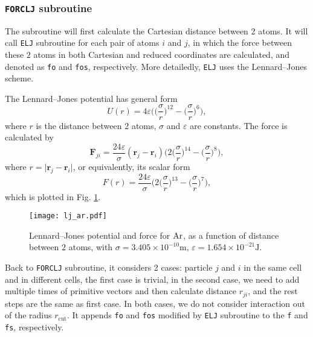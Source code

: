 
\subsubsection{\texttt{FORCLJ} subroutine}
\label{sssec:forclj}

The subroutine will first calculate the Cartesian distance between 2 atoms.
It will call \texttt{ELJ} subroutine for each pair of atoms $i$ and $j$, in which
the force between these $2$ atoms in both Cartesian and reduced coordinates
are calculated, and denoted as \texttt{fo} and \texttt{fos}, respectively.
More detailedly, \texttt{ELJ} uses the Lennard--Jones scheme.

The Lennard--Jones potential has general form
\begin{equation}
	U(r) = 4\varepsilon \bigg( \Big( \frac{ \sigma }{ r } \Big) ^ {12} -
	\Big( \frac{ \sigma }{ r } \Big) ^ 6 \bigg),
\end{equation}
where $r$ is the distance between $2$ atoms, $\sigma$ and $\varepsilon$
are constants.
The force is calculated by
\begin{equation}
	\bm{F}_{ji} = \frac{ 24\varepsilon }{ \sigma } (\bm{r}_j - \bm{r}_i)
	\bigg( 2\Big( \frac{ \sigma }{ r } \Big) ^ {14} -
	\Big( \frac{ \sigma }{ r } \Big) ^ 8 \bigg),
\end{equation}
where $r = \lvert \bm{r}_j - \bm{r}_i \rvert$, or equivalently, its scalar form
\begin{equation}
	F(r) = \frac{ 24\varepsilon }{ \sigma }
	\bigg( 2\Big( \frac{ \sigma }{ r } \Big) ^ {13} -
	\Big( \frac{ \sigma }{ r } \Big) ^ 7 \bigg),
\end{equation}
which is plotted in Fig. \ref{fig:ljar}.

\begin{figure}[h]
	\centering
	\texttt{[image: lj\_ar.pdf]}
	\caption{Lennard--Jones potential and force for $\ce{Ar}$, as a function of
		distance between $2$ atoms, with
		$\sigma=3.405\times 10^{-10}\si{\meter}$,
		$\varepsilon = 1.654\times 10^{-21}\si{\joule}$.\cite{buffalomd}}
	\label{fig:ljar}
\end{figure}

Back to \texttt{FORCLJ} subroutine,
it considers 2 cases: particle $j$ and $i$ in the same cell and
in different cells, the first case is trivial, in the second case,
we need to add multiple times of primitive vectors and then calculate distance
$r_{ji}$, and the rest steps are the same as first case. In both cases, we do not
consider interaction out of the radius $r_{\text{cut}}$.
It appends \texttt{fo} and \texttt{fos} modified by \texttt{ELJ}
subroutine to the \texttt{f} and \texttt{fs}, respectively.
